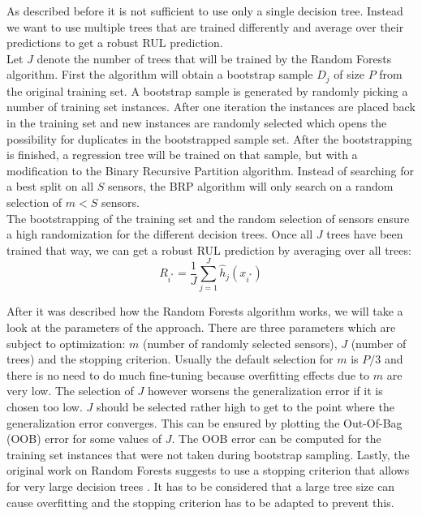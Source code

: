As described before it is not sufficient to use only a single decision tree. Instead we want to use multiple trees that are trained differently and average over their predictions to get a robust RUL prediction.\\
Let $J$ denote the number of trees that will be trained by the Random Forests algorithm. First the algorithm will obtain a bootstrap sample $D_j$ of size $P$ from the original training set. A bootstrap sample is generated by randomly picking a number of training set instances. After one iteration the instances are placed back in the training set and new instances are randomly selected which opens the possibility for duplicates in the bootstrapped sample set. After the bootstrapping is finished, a regression tree will be trained on that sample, but with a modification to the Binary Recursive Partition algorithm. Instead of searching for a best split on all $S$ sensors, the BRP algorithm will only search on a random selection of $m < S$ sensors.\\
The bootstrapping of the training set and the random selection of sensors ensure a high randomization for the different decision trees. Once all $J$ trees have been trained that way, we can get a robust RUL prediction by averaging over all trees:
\begin{equation}
    R_{i^*} = \frac{1}{J}\sum_{j=1}^J \hat{h}_j(x_{i^*})
\end{equation}

After it was described how the Random Forests algorithm works, we will take a look at the parameters of the approach. There are three parameters which are subject to optimization: $m$ (number of randomly selected sensors), $J$ (number of trees) and the stopping criterion. Usually the default selection for $m$ is $P/3$ and there is no need to do much fine-tuning because overfitting effects due to $m$ are very low. The selection of $J$ however worsens the generalization error if it is chosen too low. $J$ should be selected rather high to get to the point where the generalization error converges. This can be ensured by plotting the Out-Of-Bag (OOB) error for some values of $J$. The OOB error can be computed for the training set instances that were not taken during bootstrap sampling. Lastly, the original work on Random Forests suggests to use a stopping criterion that allows for very large decision trees \cite{GSCH:cutler2012random}. It has to be considered that a large tree size can cause overfitting and the stopping criterion has to be adapted to prevent this.

